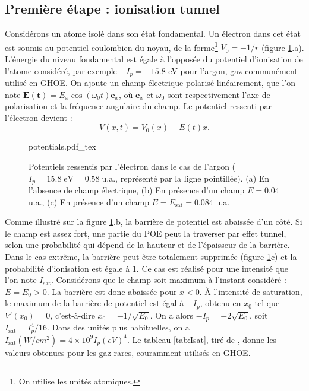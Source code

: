 \subsection{Première étape : ionisation tunnel}
Considérons un atome isolé dans son état fondamental. Un électron dans cet état est soumis au potentiel coulombien du noyau, de la forme\footnote{On utilise les unités atomiques.} $V_0 = -1/r$ (figure \ref{fig:ionization}.a). L'énergie du niveau fondamental est égale à l'opposée du potentiel d'ionisation de l'atome considéré, par exemple $-I_p=-15.8$ eV pour l'argon, gaz communément utilisé en GHOE. On ajoute un champ électrique polarisé linéairement, que l'on note $\bm{E(t)} = E_x \cos(\omega_0 t)\bm{e}_x$, où $\bm{e}_x$ et $\omega_0$ sont respectivement l'axe de polarisation et la fréquence angulaire du champ. Le potentiel ressenti par l'électron devient :
\begin{equation}
V(x,t) = V_0(x) + E(t)x.
\end{equation} 

\begin{figure}[!ht]
\centering
\def\svgwidth{\columnwidth}
{potentials.pdf_tex}
\caption{Potentiels ressentis par l'électron dans le cas de l'argon ($I_p = 15.8\; \text{eV} = 0.58\; \text{u.a.}$, représenté par la ligne pointillée). (a) En l'absence de champ électrique, (b) En présence d'un champ $E=0.04$ u.a., (c) En présence d'un champ $E=E_{\text{sat}}=0.084$ u.a.}
\label{fig:ionization}
\end{figure}

Comme illustré sur la figure \ref{fig:ionization}.b, la barrière de potentiel est abaissée d'un côté. Si le champ est assez fort, une partie du POE peut la traverser par effet tunnel, selon une probabilité qui dépend de la hauteur et de l'épaisseur de la barrière. Dans le cas extrême, la barrière peut être totalement supprimée (figure \ref{fig:ionization}c) et la probabilité d'ionisation est égale à 1. Ce cas est réalisé pour une intensité que l'on note $I_\text{sat}$. Considérons que le champ soit maximum à l'instant considéré : $E=E_0>0$. La barrière est donc abaissée pour $x<0$. \`A l'intensité de saturation, le maximum de la barrière de potentiel est égal à $-I_p$, obtenu en $x_0$ tel que $V'(x_0) = 0$, c'est-à-dire $x_0 = -1/\sqrt{E_0}$. On a alors $-I_p = -2\sqrt{E_0}$, soit $I_\text{sat} = I_p^4/16$. Dans des unités plus habituelles, on a $I_\text{sat}(\si{W/cm^2}) = 4\times10^9I_p(\si{eV})^4$. Le tableau \ref{tab:Isat}, tiré de , donne les valeurs obtenues pour les gaz rares, couramment utilisés en GHOE.

